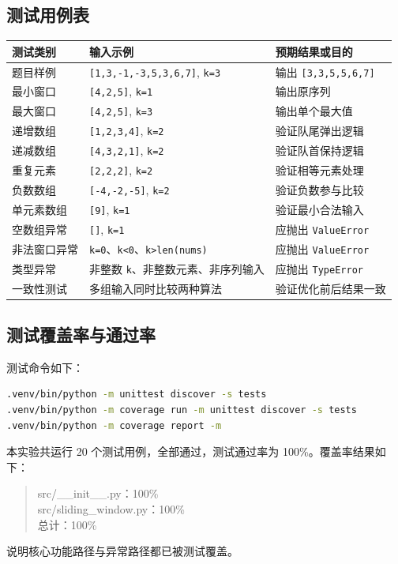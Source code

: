 \documentclass[UTF8,a4paper,12pt]{ctexart}
\begin{document}
\subsection{测试用例表}
\begin{longtable}{>{\raggedright\arraybackslash}p{3cm}>{\raggedright\arraybackslash}p{5.5cm}>{\raggedright\arraybackslash}p{4.5cm}}
    \toprule
    测试类别 & 输入示例 & 预期结果或目的 \\
    \midrule
    题目样例 & \texttt{[1,3,-1,-3,5,3,6,7]}, \texttt{k=3} & 输出 \texttt{[3,3,5,5,6,7]} \\
    最小窗口 & \texttt{[4,2,5]}, \texttt{k=1} & 输出原序列 \\
    最大窗口 & \texttt{[4,2,5]}, \texttt{k=3} & 输出单个最大值 \\
    递增数组 & \texttt{[1,2,3,4]}, \texttt{k=2} & 验证队尾弹出逻辑 \\
    递减数组 & \texttt{[4,3,2,1]}, \texttt{k=2} & 验证队首保持逻辑 \\
    重复元素 & \texttt{[2,2,2]}, \texttt{k=2} & 验证相等元素处理 \\
    负数数组 & \texttt{[-4,-2,-5]}, \texttt{k=2} & 验证负数参与比较 \\
    单元素数组 & \texttt{[9]}, \texttt{k=1} & 验证最小合法输入 \\
    空数组异常 & \texttt{[]}, \texttt{k=1} & 应抛出 \texttt{ValueError} \\
    非法窗口异常 & \texttt{k=0}、\texttt{k<0}、\texttt{k>len(nums)} & 应抛出 \texttt{ValueError} \\
    类型异常 & 非整数 \texttt{k}、非整数元素、非序列输入 & 应抛出 \texttt{TypeError} \\
    一致性测试 & 多组输入同时比较两种算法 & 验证优化前后结果一致 \\
    \bottomrule
\end{longtable}

\subsection{测试覆盖率与通过率}
测试命令如下：

\begin{lstlisting}[language=bash]
.venv/bin/python -m unittest discover -s tests
.venv/bin/python -m coverage run -m unittest discover -s tests
.venv/bin/python -m coverage report -m
\end{lstlisting}

本实验共运行 20 个测试用例，全部通过，测试通过率为 100\%。覆盖率结果如下：
\begin{quote}
src/\_\_init\_\_.py：100\% \\
src/sliding\_window.py：100\% \\
总计：100\%
\end{quote}
说明核心功能路径与异常路径都已被测试覆盖。
\end{document}
